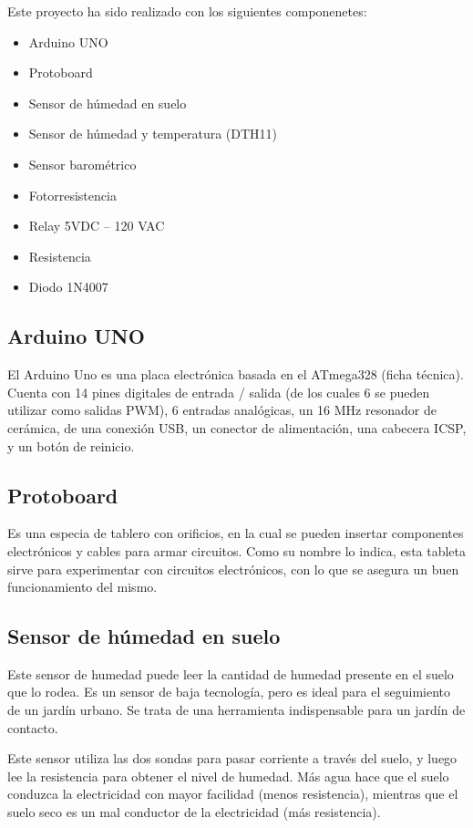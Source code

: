 \documentclass{article}
\begin{document}
Este proyecto ha sido realizado con los siguientes componenetes:

\begin{itemize}
	\item Arduino UNO
	\item Protoboard
	\item Sensor de húmedad en suelo
	\item Sensor de húmedad  y temperatura (DTH11)
	\item Sensor barométrico
	\item Fotorresistencia
	\item Relay 5VDC – 120 VAC
	\item Resistencia
	\item Diodo 1N4007
\end{itemize}

\subsection{Arduino UNO}

El Arduino Uno es una placa electrónica basada en el  ATmega328  (ficha técnica). Cuenta con 14 pines digitales de entrada / salida (de los cuales 6 se pueden utilizar como salidas PWM), 6 entradas analógicas, un 16  MHz  resonador de cerámica, de una conexión USB, un conector de alimentación, una cabecera ICSP, y un botón de reinicio.

\subsection{Protoboard}

Es una especia de tablero con orificios, en la cual se pueden insertar componentes electrónicos y cables para armar circuitos. Como su nombre lo indica, esta tableta sirve para experimentar con circuitos electrónicos, con lo que se asegura un buen funcionamiento del mismo. 

\subsection{Sensor de húmedad en suelo}

Este sensor de humedad puede leer la cantidad de humedad presente en el suelo que lo rodea. Es un sensor de baja tecnología, pero es ideal para el seguimiento de un jardín urbano. Se trata de una herramienta indispensable para un jardín de contacto.

Este sensor utiliza las dos sondas para pasar corriente a través del suelo, y luego  lee la resistencia para obtener el nivel de humedad. Más agua hace que el suelo conduzca la electricidad con mayor facilidad (menos resistencia), mientras que el suelo seco es un mal conductor de la electricidad (más resistencia).
\end{document}
